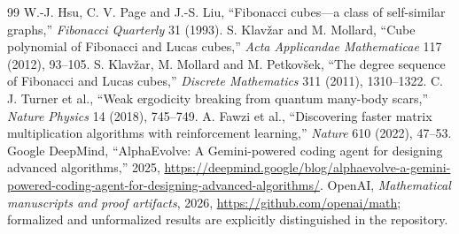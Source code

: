 \documentclass[10pt,a4paper]{article}
\begin{document}
\begin{thebibliography}{99}\small
{} W.-J. Hsu, C. V. Page and J.-S. Liu, ``Fibonacci cubes---a class of self-similar graphs,'' \emph{Fibonacci Quarterly} 31 (1993).
 S. Klav\v{z}ar and M. Mollard, ``Cube polynomial of Fibonacci and Lucas cubes,'' \emph{Acta Applicandae Mathematicae} 117 (2012), 93--105.
 S. Klav\v{z}ar, M. Mollard and M. Petkov\v{s}ek, ``The degree sequence of Fibonacci and Lucas cubes,'' \emph{Discrete Mathematics} 311 (2011), 1310--1322.
 C. J. Turner et al., ``Weak ergodicity breaking from quantum many-body scars,'' \emph{Nature Physics} 14 (2018), 745--749.
 A. Fawzi et al., ``Discovering faster matrix multiplication algorithms with reinforcement learning,'' \emph{Nature} 610 (2022), 47--53.
 Google DeepMind, ``AlphaEvolve: A Gemini-powered coding agent for designing advanced algorithms,'' 2025, \url{https://deepmind.google/blog/alphaevolve-a-gemini-powered-coding-agent-for-designing-advanced-algorithms/}.
 OpenAI, \emph{Mathematical manuscripts and proof artifacts}, 2026, \url{https://github.com/openai/math}; formalized and unformalized results are explicitly distinguished in the repository.
\end{thebibliography}
\end{document}
